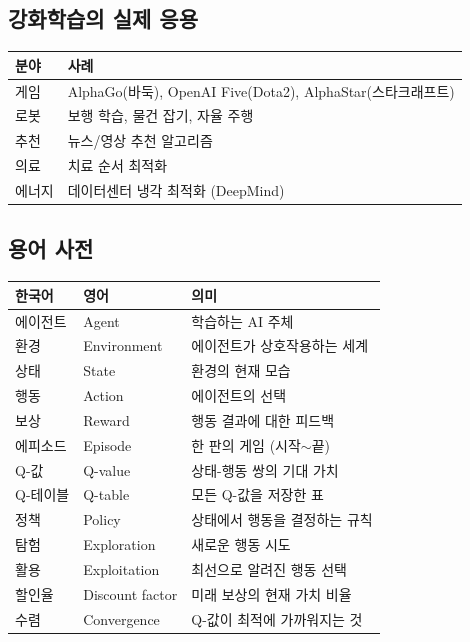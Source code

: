 \documentclass[11pt,a4paper]{article}
\begin{document}
\subsection{강화학습의 실제 응용}

\begin{center}
\renewcommand{\arraystretch}{1.4}
\begin{tabular}{|l|p{9cm}|}
\hline
\rowcolor{tableheader}
\textbf{분야} & \textbf{사례} \\
\hline
게임 & AlphaGo(바둑), OpenAI Five(Dota2), AlphaStar(스타크래프트) \\
\hline
로봇 & 보행 학습, 물건 잡기, 자율 주행 \\
\hline
추천 & 뉴스/영상 추천 알고리즘 \\
\hline
의료 & 치료 순서 최적화 \\
\hline
에너지 & 데이터센터 냉각 최적화 (DeepMind) \\
\hline
\end{tabular}
\end{center}

\subsection{용어 사전}

\begin{center}
\renewcommand{\arraystretch}{1.3}
\small
\begin{tabular}{|l|l|p{6.5cm}|}
\hline
\rowcolor{tableheader}
\textbf{한국어} & \textbf{영어} & \textbf{의미} \\
\hline
에이전트 & Agent & 학습하는 AI 주체 \\
\hline
환경 & Environment & 에이전트가 상호작용하는 세계 \\
\hline
상태 & State & 환경의 현재 모습 \\
\hline
행동 & Action & 에이전트의 선택 \\
\hline
보상 & Reward & 행동 결과에 대한 피드백 \\
\hline
에피소드 & Episode & 한 판의 게임 (시작$\sim$끝) \\
\hline
Q-값 & Q-value & 상태-행동 쌍의 기대 가치 \\
\hline
Q-테이블 & Q-table & 모든 Q-값을 저장한 표 \\
\hline
정책 & Policy & 상태에서 행동을 결정하는 규칙 \\
\hline
탐험 & Exploration & 새로운 행동 시도 \\
\hline
활용 & Exploitation & 최선으로 알려진 행동 선택 \\
\hline
할인율 & Discount factor & 미래 보상의 현재 가치 비율 \\
\hline
수렴 & Convergence & Q-값이 최적에 가까워지는 것 \\
\hline
\end{tabular}
\end{center}
\end{document}

